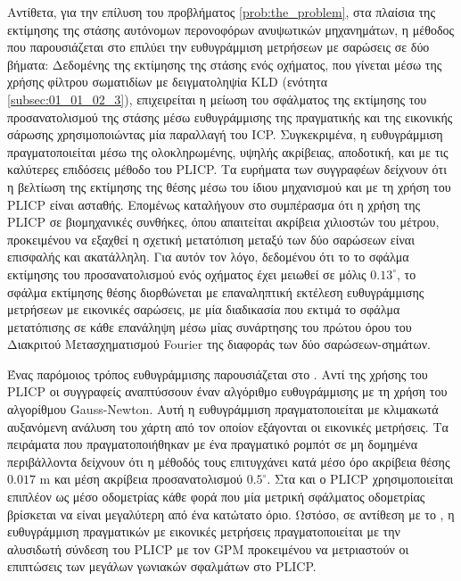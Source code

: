 Αντίθετα, για την επίλυση του προβλήματος \ref{prob:the_problem}, στα πλαίσια
της εκτίμησης της στάσης αυτόνομων περονοφόρων ανυψωτικών μηχανημάτων, η
μέθοδος που παρουσιάζεται στο \cite{Vasiljevic2016b} επιλύει την ευθυγράμμιση
μετρήσεων με σαρώσεις σε δύο βήματα: Δεδομένης της εκτίμησης της στάσης ενός
οχήματος, που γίνεται μέσω της χρήσης φίλτρου σωματιδίων με δειγματοληψία KLD
(ενότητα \ref{subsec:01_01_02_3}), επιχειρείται η μείωση του σφάλματος της
εκτίμησης του προσανατολισμού της στάσης μέσω ευθυγράμμισης της πραγματικής και
της εικονικής σάρωσης χρησιμοποιώντας μία παραλλαγή του ICP. Συγκεκριμένα, η
ευθυγράμμιση πραγματοποιείται μέσω της ολοκληρωμένης, υψηλής ακρίβειας,
αποδοτική, και με τις καλύτερες επιδόσεις μέθοδο του PLICP.  Τα ευρήματα των
συγγραφέων δείχνουν ότι η βελτίωση της εκτίμησης της θέσης μέσω του ίδιου
μηχανισμού και με τη χρήση του PLICP είναι ασταθής. Επομένως καταλήγουν στο
συμπέρασμα ότι η χρήση της PLICP σε βιομηχανικές συνθήκες, όπου απαιτείται
ακρίβεια χιλιοστών του μέτρου, προκειμένου να εξαχθεί η σχετική μετατόπιση
μεταξύ των δύο σαρώσεων είναι επισφαλής και ακατάλληλη. Για αυτόν τον λόγο,
δεδομένου ότι το το σφάλμα εκτίμησης του προσανατολισμού ενός οχήματος έχει
μειωθεί σε μόλις $0.13^\circ$, το σφάλμα εκτίμησης θέσης διορθώνεται με
επαναληπτική εκτέλεση ευθυγράμμισης μετρήσεων με εικονικές σαρώσεις, με μία
διαδικασία που εκτιμά το σφάλμα μετατόπισης σε κάθε επανάληψη μέσω μίας
συνάρτησης του πρώτου όρου του Διακριτού Μετασχηματισμού Fourier της διαφοράς
των δύο σαρώσεων-σημάτων.

Ένας παρόμοιος τρόπος ευθυγράμμισης παρουσιάζεται στο \cite{Peng2018a}. Αντί
της χρήσης του PLICP οι συγγραφείς αναπτύσσουν έναν αλγόριθμο ευθυγράμμισης με
τη χρήση του αλγορίθμου Gauss-Newton.  Αυτή η ευθυγράμμιση πραγματοποιείται με
κλιμακωτά αυξανόμενη ανάλυση του χάρτη από τον οποίον εξάγονται οι εικονικές
μετρήσεις.  Τα πειράματα που πραγματοποιήθηκαν με ένα πραγματικό ρομπότ σε μη
δομημένα περιβάλλοντα δείχνουν ότι η μέθοδός τους επιτυγχάνει κατά μέσο όρο
ακρίβεια θέσης $0.017$ m και μέση ακρίβεια προσανατολισμού $0.5^\circ$. Στα
\cite{Chen2019a} και \cite{Liu2019a} ο PLICP χρησιμοποιείται επιπλέον ως μέσο
οδομετρίας κάθε φορά που μία μετρική σφάλματος οδομετρίας βρίσκεται να είναι
μεγαλύτερη από ένα κατώτατο όριο. Ωστόσο, σε αντίθεση με το \cite{Peng2018a}, η
ευθυγράμμιση πραγματικών με εικονικές μετρήσεις πραγματοποιείται με την
αλυσιδωτή σύνδεση του PLICP με τον GPM \cite{Censib} προκειμένου να μετριαστούν
οι επιπτώσεις των μεγάλων γωνιακών σφαλμάτων στο PLICP.

